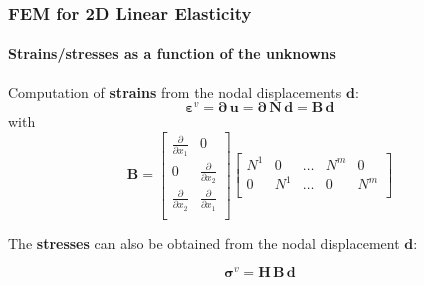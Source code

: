 \documentclass[10pt,xcolor=pdftex,dvipsnames,table]{beamer}
\begin{document}
\begin{frame}
	\frametitle{ FEM for 2D Linear Elasticity }
	\framesubtitle{ Strains/stresses as a function of the unknowns}
	
	Computation of \textbf{strains} from the nodal displacements $\boldsymbol{d}$:
	\begin{equation*}
		\boldsymbol{\varepsilon}^v = \boldsymbol{\partial}\,\boldsymbol{u} = 	\boldsymbol{\partial}\,\mathbf{N}\,\boldsymbol{d} = \mathbf{B}\,\boldsymbol{d}
	\end{equation*}		
	with
	\begin{equation*}
	\mathbf{B} =
		\begin{bmatrix}
			\frac{\partial}{\partial x_1} & 0  \\
			0 &\frac{\partial}{\partial x_2}  \\
			\frac{\partial}{\partial x_2} & \frac{\partial}{\partial x_1}   \\
		\end{bmatrix}
		\begin{bmatrix}
			N^1 & 0      &  \dots & N^m & 0 \\
			0   & N^1    &  \dots & 0 & N^m  \\
		\end{bmatrix}	
	\end{equation*}
	
	
		
	The \textbf{stresses} can also be obtained from the nodal displacement $\boldsymbol{d}$: 

	\begin{equation*}
		\boldsymbol{\sigma}^v = \mathbf{H}\,\mathbf{B}\,\boldsymbol{d}
	\end{equation*}		
	
\end{frame}
\end{document}
